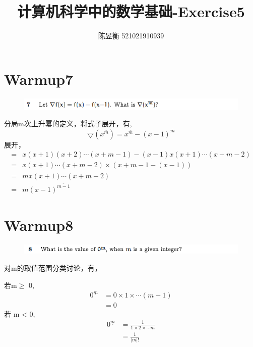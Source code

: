 \documentclass[]{article}
\title{计算机科学中的数学基础-Exercise5}
\author{陈昱衡 521021910939}
\date{}
\begin{document}
\maketitle

\section*{Warmup7}
\begin{figure}[H]
    \includegraphics[scale = 1]{Q1.png}
\end{figure}
分局m次上升幂的定义，将式子展开，有,
\begin{equation}
    \bigtriangledown{(x^{\bar{m}})} = x^{\bar{m}} - (x-1)^{\bar{m}}
\end{equation}
展开，
\begin{align}
    =&x(x+1)(x+2)\cdots(x+m-1)-(x-1)x(x+1)\cdots(x+m-2) \\
    =&x(x+1)\cdots(x+m-2) \times (x+m-1-(x-1))\\
    =&mx(x+1)\cdots(x+m-2)\\
    =&m(x-1)^{\overline{m-1}}
\end{align}

\section*{Warmup8}
\begin{figure}[H]
    \includegraphics[scale = 1]{Q2.png}
\end{figure}
对m的取值范围分类讨论，有，\par 
若m$ \ge$ 0,
\begin{align}
    0^{\underline{m}} &= 0 \times 1 \times \cdots (m-1)\\
                        & =0
\end{align}
若 m < 0,
\begin{align}
    0^{\underline{m}} &= \frac{1}{1\times 2 \times \cdots m}\\
                        &=\frac{1}{|m|!}
\end{align}
\end{document}
